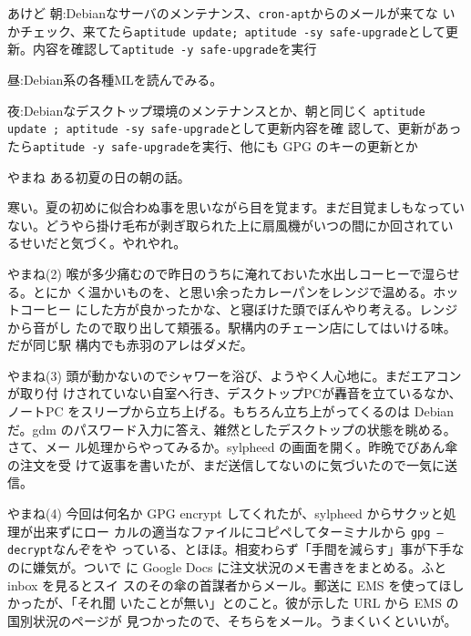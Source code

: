 \begin{frame}{あけど}
朝:Debianなサーバのメンテナンス、\texttt{cron-apt}からのメールが来てな
 いかチェック、来てたら\texttt{aptitude update; aptitude -sy
 safe-upgrade}として更新。内容を確認して\texttt{aptitude -y
 safe-upgrade}を実行

昼:Debian系の各種MLを読んでみる。

夜:Debianなデスクトップ環境のメンテナンスとか、朝と同じく
 \texttt{aptitude update ; aptitude -sy safe-upgrade}として更新内容を確
 認して、更新があったら\texttt{aptitude -y safe-upgrade}を実行、他にも
 GPG のキーの更新とか
\end{frame}

\begin{frame}{やまね}
 ある初夏の日の朝の話。

 寒い。夏の初めに似合わぬ事を思いながら目を覚ます。まだ目覚ましもなってい
 ない。どうやら掛け毛布が剥ぎ取られた上に扇風機がいつの間にか回されてい
 るせいだと気づく。やれやれ。
\end{frame}

\begin{frame}{やまね(2)}
 喉が多少痛むので昨日のうちに淹れておいた水出しコーヒーで湿らせる。とにか
 く温かいものを、と思い余ったカレーパンをレンジで温める。ホットコーヒー
 にした方が良かったかな、と寝ぼけた頭でぼんやり考える。レンジから音がし
 たので取り出して頬張る。駅構内のチェーン店にしてはいける味。だが同じ駅
 構内でも赤羽のアレはダメだ。
\end{frame}

\begin{frame}{やまね(3)}
 頭が動かないのでシャワーを浴び、ようやく人心地に。まだエアコンが取り付
 けされていない自室へ行き、デスクトップPCが轟音を立ているなか、ノートPC
 をスリープから立ち上げる。もちろん立ち上がってくるのは Debian だ。gdm
 のパスワード入力に答え、雑然としたデスクトップの状態を眺める。さて、メー
 ル処理からやってみるか。sylpheed の画面を開く。昨晩でびあん傘の注文を受
 けて返事を書いたが、まだ送信してないのに気づいたので一気に送信。
\end{frame}

\begin{frame}{やまね(4)}
今回は何名か GPG encrypt してくれたが、sylpheed からサクッと処理が出来ずにロー
 カルの適当なファイルにコピペしてターミナルから \texttt{gpg --decrypt}なんぞをや
っている、とほほ。相変わらず「手間を減らす」事が下手なのに嫌気が。ついで
 に Google Docs に注文状況のメモ書きをまとめる。ふと inbox を見るとスイ
 スのその傘の首謀者からメール。郵送に EMS を使ってほしかったが、「それ聞
 いたことが無い」とのこと。彼が示した URL から EMS の国別状況のページが
 見つかったので、そちらをメール。うまくいくといいが。
\end{frame}

